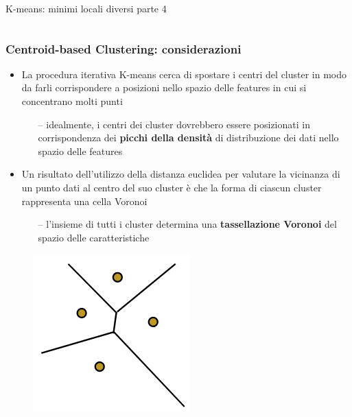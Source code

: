 \begin{frame}
\begin{block}{K-means: minimi locali diversi parte 4}
\begin{columns}
		\end{columns}
	\end{block}

\end{frame}


\begin{frame}

	\frametitle{{\color{GradientDescentDiagramBlue}Centroid-based Clustering}: considerazioni}


		\begin{itemize}
			\item La procedura iterativa K-means cerca di spostare i centri del cluster in modo da farli corrispondere a posizioni nello spazio delle features in cui si concentrano molti punti
				\begin{itemize}
					\item[--] idealmente, i centri dei cluster dovrebbero essere posizionati in corrispondenza dei \textbf{picchi della densità} di distribuzione dei dati nello spazio delle features
				\end{itemize}
			\item Un risultato dell'utilizzo della distanza euclidea per valutare la vicinanza di un punto dati al centro del suo cluster è che la forma di ciascun cluster rappresenta una cella Voronoi
				\begin{itemize}
					\item[--] l'insieme di tutti i cluster determina una \textbf{tassellazione Voronoi} del spazio delle caratteristiche
				\end{itemize}
		\end{itemize}

		\begin{figure}[!htbp]
				\centering
				\includegraphics[angle=0,width=0.18\linewidth]{images/unsupervised/kmeans/kmeans_voronoi.png}
			\end{figure}

\end{frame}


